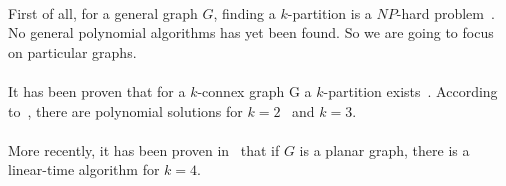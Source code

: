 \paragraph{}
First of all, for a general graph $G$, finding a $k$-partition is a $NP$-hard
problem~\cite{Dyer1985139}. No general polynomial algorithms has yet been found.
So we are going to focus on particular graphs.

\paragraph{}
It has been proven that for a $k$-connex graph G a $k$-partition
exists~\cite{GE78,LL77}.
According to~\cite{JS94}, there are polynomial solutions for
$k=2$~\cite{GE78,LL77} and $k=3$.

\paragraph{}
More recently, it has been proven in~\cite{Nakano1997315} that if $G$ is a planar graph, there is a linear-time algorithm for $k = 4$.





